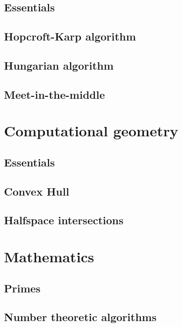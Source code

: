 \documentclass[a4paper]{article}
\newcommand{\includesnippet}[2]{

}
\begin{document}
    \subsection{Essentials}
  
    \subsection{Hopcroft-Karp algorithm}
    
    \subsection{Hungarian algorithm}
    
    \subsection{Meet-in-the-middle}
    
  \section{Computational geometry}
    
    \subsection{Essentials}
    \includesnippet{snippets/geometryessentials.cpp}{C++}
    
    \subsection{Convex Hull}
    
    \subsection{Halfspace intersections}
    
  \section{Mathematics}
    
    \subsection{Primes}
    \includesnippet{snippets/primes.cpp}{C++}
    
    \subsection{Number theoretic algorithms}
    \includesnippet{snippets/numbertheory.cpp}{C++}
    
\end{document}
